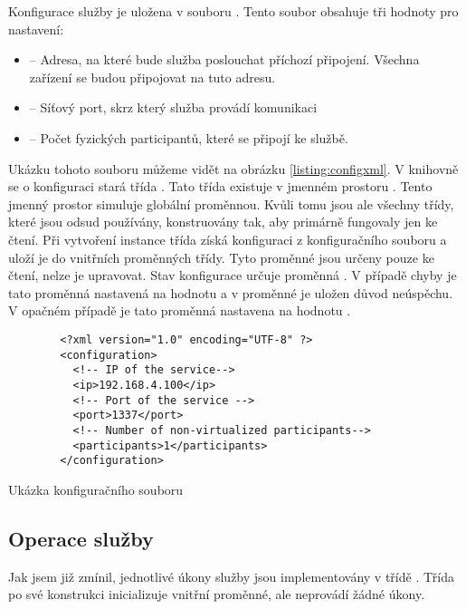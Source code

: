 Konfigurace služby je uložena v souboru . Tento soubor obsahuje tři hodnoty pro nastavení:

\begin{itemize}
    \item {} -- Adresa, na které bude služba poslouchat příchozí připojení. Všechna zařízení se budou připojovat na tuto adresu.
    \item {} -- Síťový port, skrz který služba provádí komunikaci
    \item {} -- Počet fyzických participantů, které se připojí ke službě.   
\end{itemize}

Ukázku tohoto souboru můžeme vidět na obrázku \ref{listing:configxml}. V knihovně se o konfiguraci stará třída . Tato třída existuje v jmenném prostoru . Tento jmenný prostor simuluje globální proměnnou. Kvůli tomu jsou ale všechny třídy, které jsou odsud používány, konstruovány tak, aby primárně fungovaly jen ke čtení. Při vytvoření instance třída získá konfiguraci z konfiguračního souboru a uloží je do vnitřních proměnných třídy. Tyto proměnné jsou určeny pouze ke čtení, nelze je upravovat. Stav konfigurace určuje proměnná . V případě chyby je tato proměnná nastavená na hodnotu  a v proměnné  je uložen důvod neúspěchu. V opačném případě je tato proměnná nastavena na hodnotu .

\begin{listing}[htbp]
    \begin{verbatim}
        <?xml version="1.0" encoding="UTF-8" ?>
        <configuration>
          <!-- IP of the service-->
          <ip>192.168.4.100</ip>
          <!-- Port of the service -->
          <port>1337</port>
          <!-- Number of non-virtualized participants-->
          <participants>1</participants>
        </configuration>
    \end{verbatim}
    \caption{Ukázka konfiguračního souboru}
    \label{listing:configxml}
\end{listing}


\subsection{Operace služby}

Jak jsem již zmínil, jednotlivé úkony služby jsou implementovány v třídě . Třída po své konstrukci inicializuje vnitřní proměnné, ale neprovádí žádné úkony. 


